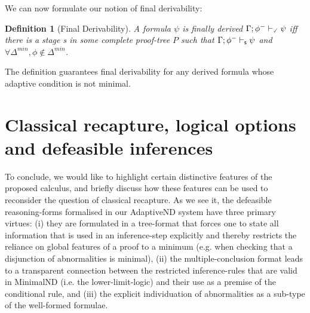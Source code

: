 \documentclass[]{article}
\newtheorem{definition}{Definition}
\newcommand{\Turn}[2]
    { {#1}\vdash_{\textbf{\sf s}}  {#2}}
\newcommand{\TurnChecked}[2]
    { {#1}\vdash_{\textbf{\sf \checked}}  {#2}}
\begin{document}

We can now formulate our notion of final derivability:

\begin{definition}[Final Derivability]
A formula $\psi$ is finally derived $\TurnChecked{\Gamma;\phi^{-}}{\psi}$ iff there is a stage {\sf s}  in some complete proof-tree $P$
 such that $\Turn{\Gamma;\phi^{-}}{\psi}$ and $\forall \Delta^{min},\phi \notin \Delta^{min}$.
\end{definition}
%
The definition guarantees final derivability for any derived formula whose  adaptive condition is not minimal. 

\section{Classical recapture, logical options and defeasible inferences}\label{sec:recap}
To conclude, we would like to highlight certain distinctive features of the proposed calculus, and briefly discuss how these features can be used to reconsider the question of classical recapture. As we see it, the defeasible reasoning-forms formalised in our \textsf{AdaptiveND} system have three primary virtues: (i) they are formulated in a tree-format that forces one to state all information that is used in an inference-step explicitly and thereby restricts the reliance on global features of a proof to a minimum (e.g. when checking that a disjunction of abnormalities is minimal), (ii) the multiple-conclusion format leads to a transparent connection between the restricted inference-rules that are valid in \textsf{MinimalND} (i.e. the lower-limit-logic) and their use as a premise of the conditional rule, and (iii) the explicit individuation of abnormalities as a sub-type of the well-formed formulae.
\end{document}
